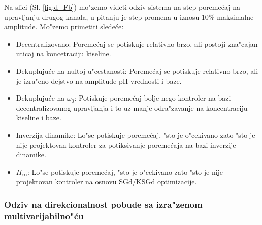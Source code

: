 \documentclass[a4paper,11pt]{article}
\theoremstyle{definition} \newtheorem{deff}{Definicija}[section]
\theoremstyle{definition} \newtheorem{prim}[deff]{Primer}
\theoremstyle{plain} \newtheorem{teor}[deff]{Teorema}
\begin{document}
			Na slici (Sl. \ref{fig:d_Fb}) mo"zemo videti odziv sistema na step poreme\'caj na upravljanju drugog kanala, u pitanju je step promena u iznosu 10\% maksimalne amplitude. Mo"zemo primetiti slede\'ce:
			\begin{itemize}
				\item Decentralizovano: Poreme\'caj se potiskuje relativno brzo, ali postoji zna"cajan uticaj na koncetraciju kiseline.
				
				\item Dekupluju\'ce na nultoj u"cestanosti: Poreme\'caj se potiskuje relativno brzo, ali je izra"eno dejstvo na amplitude pH vrednosti i baze.
				
				\item Dekupluju\'ce na $\omega_0$: Potiskuje poreme\'caj bolje nego kontroler na bazi decentralizovanog upravljanja i to uz manje odra"zavanje na koncentraciju kiseline i baze.
				
				\item Inverzija dinamike: Lo"se potiskuje poreme\'caj, "sto je o"cekivano zato "sto je nije projektovan kontroler za potiksivanje poreme\'caja na bazi inverzije dinamike.
				
				\item $H_{\infty}$: Lo"se potiskuje poreme\'caj, "sto je o"cekivano zato "sto je nije projektovan kontroler na osnovu SGd/KSGd optimizacije.
				
			\end{itemize}
			
			\newpage
			\subsubsection{Odziv na direkcionalnost pobude sa izra"zenom multivarijabilno"\'cu}
			
\end{document}
